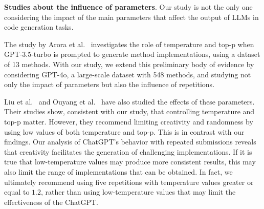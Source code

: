 \textbf{Studies about the influence of parameters}. Our study is not the only one considering the impact of the main parameters that affect the output of LLMs in code generation tasks. 

The study by Arora et al.~\cite{arora2024optimizing} investigates the role of temperature and top-p when GPT-3.5-turbo is prompted to generate method implementations, using a dataset of 13 methods. With our study, we extend this preliminary body of evidence by considering GPT-4o, a large-scale dataset with 548 methods, and studying not only the impact of parameters but also the influence of repetitions.  

Liu et al.~\cite{liu2024your} and Ouyang et al.~\cite{ouyang2023empirical} have also studied the effects of these parameters. Their studies show, consistent with our study, that controlling temperature and top-p matter. However, they recommend limiting creativity and randomness by using low values of both temperature and top-p. This is in contrast with our findings. Our analysis of ChatGPT's behavior with repeated submissions reveals that creativity facilitates the generation of challenging implementations. If it is true that low-temperature values may produce more consistent results, this may also limit the range of implementations that can be obtained. In fact, we ultimately recommend using five repetitions with temperature values greater or equal to $1.2$, rather than using low-temperature values that may limit the effectiveness of the ChatGPT. 



